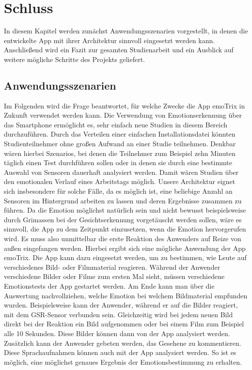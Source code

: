 \section{Schluss}
In diesem Kapitel werden zunächst Anwendungsszenarien vorgestellt, in denen die entwickelte App mit ihrer Architektur sinnvoll eingesetzt werden kann. Anschließend wird ein Fazit zur gesamten Studienarbeit und ein Ausblick auf weitere mögliche Schritte des Projekts geliefert.
\subsection{Anwendungsszenarien}
Im Folgenden wird die Frage beantwortet, für welche Zwecke die App emoTrix in Zukunft verwendet werden kann. \newline
Die Verwendung von Emotionserkennung über das Smartphone ermöglicht es, sehr einfach neue Studien in diesem Bereich durchzuführen. Durch das Verteilen einer einfachen Installationsdatei könnten Studienteilnehmer ohne großen Aufwand an einer Studie teilnehmen. Denkbar wären hierbei Szenarios, bei denen die Teilnehmer zum Beispiel zehn Minuten täglich einen Test durchführen sollen oder in denen sie durch eine bestimmte Auswahl von Sensoren dauerhaft analysiert werden. Damit wären Studien über den emotionalen Verlauf eines Arbeitstags möglich.\newline
Unsere Architektur eignet sich insbesondere für solche Fälle, da es möglich ist, eine beliebige Anzahl an Sensoren im Hintergrund arbeiten zu lassen und deren Ergebnisse zusammen zu führen.\newline 
Da die Emotion möglichst natürlich sein und nicht bewusst beispielsweise durch Grimassen bei der Gesichtserkennung vorgetäuscht werden sollen, wäre es sinnvoll, die App zu dem Zeitpunkt einzusetzen, wenn die Emotion hervorgerufen wird. Es muss also unmittelbar die erste Reaktion des Anwenders auf Reize von außen eingefangen werden. Hierbei ergibt sich eine mögliche Anwendung der App emoTrix. \newline
Die App kann dazu eingesetzt werden, um zu bestimmen, wie Leute auf verschiedenes Bild- oder Filmmaterial reagieren. Während der Anwender verschiedene Bilder oder Filme zum ersten Mal sieht, müssen verschiedene Emotionstests der App gestartet werden. Am Ende kann man über die Auswertung nachvollziehen, welche Emotion bei welchem Bildmaterial empfunden wurden. Beispielsweise kann der Anwender, während er auf die Bilder reagiert, mit dem GSR-Sensor verbunden sein. Gleichzeitig wird bei jedem neuen Bild direkt bei der Reaktion ein Bild aufgenommen oder bei einem Film zum Beispiel alle 10 Sekunden. Diese Bilder können dann von der App analysiert werden. Zusätzlich kann der Anwender gebeten werden, das Gesehene zu kommentieren. Diese Sprachaufnahmen können auch mit der App analysiert werden. So ist es möglich, eine möglichst genaues Ergebnis der Emotionsbestimmung zu erhalten. \newline
